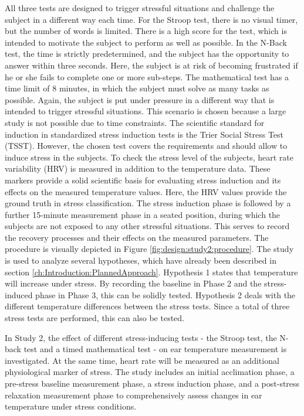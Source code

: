 All three tests are designed to trigger stressful situations and challenge the subject in a different way each time.
For the Stroop test, there is no visual timer, but the number of words is limited. 
There is a high score for the test, which is intended to motivate the subject to perform as well as possible. 
In the N-Back test, the time is strictly predetermined, and the subject has the opportunity to answer within three seconds.
Here, the subject is at risk of becoming frustrated if he or she fails to complete one or more sub-steps.
The mathematical test has a time limit of 8 minutes, in which the subject must solve as many tasks as possible.
Again, the subject is put under pressure in a different way that is intended to trigger stressful situations.
This scenario is chosen because a large study is not possible due to time constraints. 
The scientific standard for induction in standardized stress induction tests is the Trier Social Stress Test (TSST). 
However, the chosen test covers the requirements and should allow to induce stress in the subjects.
To check the stress level of the subjects, heart rate variability (HRV) is measured in addition to the temperature data. 
These markers provide a solid scientific basis for evaluating stress induction and its effects on the measured temperature values.
Here, the HRV values provide the ground truth in stress classification.
The stress induction phase is followed by a further 15-minute measurement phase in a seated position, during which the subjects are not exposed to any other stressful situations. 
This serves to record the recovery processes and their effects on the measured parameters. 
The procedure is visually depicted in Figure \ref{fig:design:study2:procedure}.
The study is used to analyze several hypotheses, which have already been described in section \ref{ch:Introduction:PlannedApproach}.
Hypothesis 1 states that temperature will increase under stress.
By recording the baseline in Phase 2 and the stress-induced phase in Phase 3, this can be solidly tested.
Hypothesis 2 deals with the different temperature differences between the stress tests.
Since a total of three stress tests are performed, this can also be tested.

In Study 2, the effect of different stress-inducing tests - the Stroop test, the N-back test and a timed mathematical test - on ear temperature measurement is investigated.
At the same time, heart rate will be measured as an additional physiological marker of stress. 
The study includes an initial acclimation phase, a pre-stress baseline measurement phase, a stress induction phase, and a post-stress relaxation measurement phase to comprehensively assess changes in ear temperature under stress conditions.